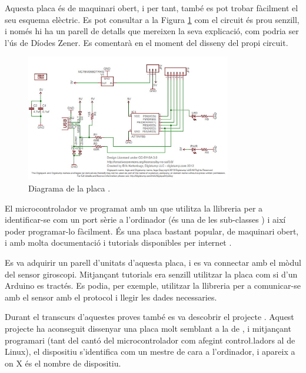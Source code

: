 Aquesta placa és de maquinari obert, i per tant, també es pot trobar fàcilment
el seu esquema elèctric. Es pot consultar a la Figura \ref{fig:digisparksch}
com el circuit és prou senzill, i només hi ha un parell de detalls que mereixen
la seva explicació, com podria ser l'ús de Díodes Zener. Es comentarà en el
moment del disseny del propi circuit.

\begin{figure}[ht]
    \centering
    \includegraphics[width=0.8\textwidth]{images/modules/digisparksch.jpg}
    \caption{Diagrama de la placa  \cite{Digispark}.}
    \label{fig:digisparksch}
\end{figure}

El microcontrolador ve programat amb un  que utilitza la
llibreria  per a identificar-se com un port sèrie a l'ordinador
(és una de les sub-classes ) i així poder programar-lo fàcilment.
És una placa bastant popular, de maquinari obert, i amb molta documentació i
tutorials disponibles per internet \cite{DigisparkBootloader}.

Es va adquirir un parell d'unitats d'aquesta placa, i es va connectar amb el
mòdul del sensor giroscopi. Mitjançant tutorials era senzill utilitzar la
placa  com si d'un Arduino es tractés. Es podia, per exemple,
utilitzar la llibreria  per a comunicar-se amb el sensor amb el
protocol  i llegir les dades necessaries.

Durant el transcurs d'aquestes proves també es va descobrir el projecte
 \cite{I2cTinyUsb}. Aquest projecte ha aconseguit dissenyar una placa
molt semblant a la de , i mitjançant programari (tant del cantó
del microcontrolador com afegint contro\l.ladors al  de Linux),
el dispositiu s'identifica com un mestre  de cara a l'ordinador, i
apareix a  on X és el nombre de dispositiu.

